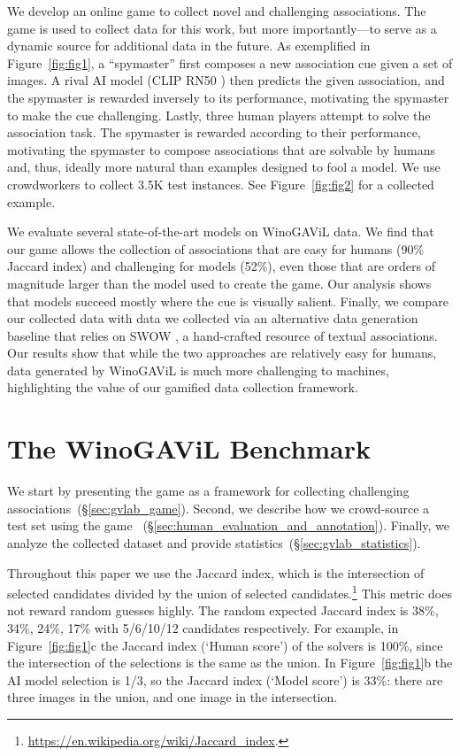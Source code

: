 \documentclass{article}
\newcommand{\ouracronym}[0]{WinoGAViL}
\begin{document}
We develop an online game to collect novel and challenging associations. The game is used to collect data for this work, but more importantly---to serve as a dynamic source for additional data in the future. As exemplified in Figure~\ref{fig:fig1}, a ``spymaster'' first composes a new association cue given a set of images. A rival AI model (CLIP RN50 \cite{radford2021learning}) then predicts the given association, and the spymaster is rewarded inversely to its performance, motivating the spymaster to make the cue challenging. Lastly, three human players attempt to solve the association task. The spymaster is rewarded according to their performance, motivating the spymaster to compose associations that are solvable by humans and, thus, ideally more natural than examples designed to fool a model. We use crowdworkers to collect 3.5K test instances. See Figure~\ref{fig:fig2} for a collected example. 

We evaluate several state-of-the-art models on \ouracronym{} data. We find that our game allows the collection of associations that are easy for humans (90\% Jaccard index) and challenging for models (52\%), even those that are orders of magnitude larger than the model used to create the game. Our analysis shows that models succeed mostly where the cue is visually salient. Finally, we compare our collected data with data we collected via an alternative data generation baseline that relies on SWOW \cite{de2019small}, a hand-crafted resource of textual associations. Our results show that while the two approaches are relatively easy for humans, data generated by \ouracronym{} is much more challenging to machines, highlighting the value of our gamified data collection framework. 
\section{The \ouracronym{} Benchmark}
We start by presenting the game as a framework for collecting challenging associations~(\S\ref{sec:gvlab_game}). Second, we describe how we crowd-source a test set using the game ~(\S\ref{sec:human_evaluation_and_annotation}). Finally, we analyze the collected dataset and provide statistics~(\S\ref{sec:gvlab_statistics}).

\label{sec:metric_for_success}
Throughout this paper we use the Jaccard index, which is the intersection of selected candidates divided by the union of selected candidates.\footnote{\url{https://en.wikipedia.org/wiki/Jaccard_index}.} This metric does not reward random guesses highly. The random expected Jaccard index is 38\%, 34\%, 24\%, 17\% with 5/6/10/12 candidates respectively. For example, in Figure~\ref{fig:fig1}c the Jaccard index (`Human score') of the solvers is 100\%, since the intersection of the selections is the same as the union. In Figure~\ref{fig:fig1}b the AI model selection is 1/3, so the Jaccard index (`Model score') is 33\%: there are three images in the union, and one image in the intersection.  
\end{document}
